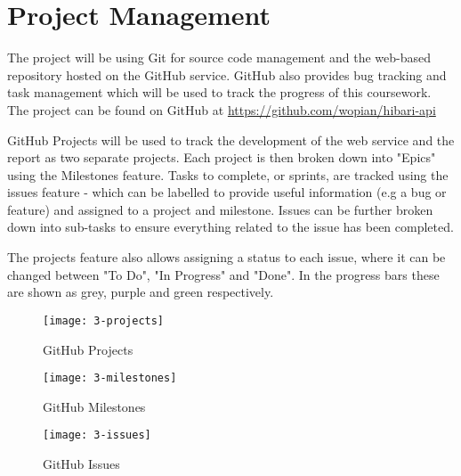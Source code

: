 \chapter{Project Management}

The project will be using Git for source code management and the web-based repository hosted on the GitHub service. GitHub also provides bug tracking and task management which will be used to track the progress of this coursework. The project can be found on GitHub at \url{https://github.com/wopian/hibari-api}

GitHub Projects will be used to track the development of the web service and the report as two separate projects. Each project is then broken down into "Epics" using the Milestones feature. Tasks to complete, or sprints, are tracked using the issues feature - which can be labelled to provide useful information (e.g a bug or feature) and assigned to a project and milestone. Issues can be further broken down into sub-tasks to ensure everything related to the issue has been completed.

The projects feature also allows assigning a status to each issue, where it can be changed between "To Do", "In Progress" and "Done". In the progress bars these are shown as grey, purple and green respectively.

\begin{figure}[H]
  \caption{GitHub Projects}
  \centering
  \texttt{[image: 3-projects]}
\end{figure}

\begin{figure}[H]
  \caption{GitHub Milestones}
  \centering
  \texttt{[image: 3-milestones]}
\end{figure}

\begin{figure}[H]
  \caption{GitHub Issues}
  \centering
  \texttt{[image: 3-issues]}
\end{figure}

